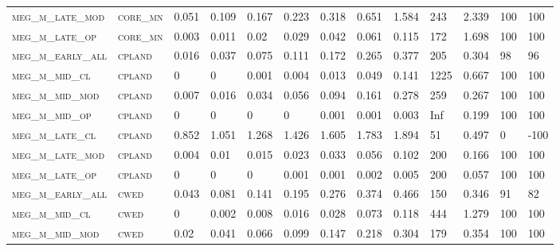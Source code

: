 \begin{landscape}
\begin{center}
\begin{footnotesize}
\begin{longtable}{lllllllllllll}
\textsc{meg\_m\_late\_mod } & \textsc{core\_mn  }   & 0.051    & 0.109    & 0.167    & 0.223    & 0.318    & 0.651    & 1.584    & 243    & 2.339         & 100           & 100             \\
\textsc{meg\_m\_late\_op  } & \textsc{core\_mn  }   & 0.003    & 0.011    & 0.02     & 0.029    & 0.042    & 0.061    & 0.115    & 172    & 1.698         & 100           & 100             \\
\textsc{meg\_m\_early\_all} & \textsc{cpland    }   & 0.016    & 0.037    & 0.075    & 0.111    & 0.172    & 0.265    & 0.377    & 205    & 0.304         & 98            & 96              \\
\textsc{meg\_m\_mid\_cl   } & \textsc{cpland    }   & 0        & 0        & 0.001    & 0.004    & 0.013    & 0.049    & 0.141    & 1225   & 0.667         & 100           & 100             \\
\textsc{meg\_m\_mid\_mod  } & \textsc{cpland    }   & 0.007    & 0.016    & 0.034    & 0.056    & 0.094    & 0.161    & 0.278    & 259    & 0.267         & 100           & 100             \\
\textsc{meg\_m\_mid\_op   } & \textsc{cpland    }   & 0        & 0        & 0        & 0        & 0.001    & 0.001    & 0.003    & Inf    & 0.199         & 100           & 100             \\
\textsc{meg\_m\_late\_cl  } & \textsc{cpland    }   & 0.852    & 1.051    & 1.268    & 1.426    & 1.605    & 1.783    & 1.894    & 51     & 0.497         & 0             & -100            \\
\textsc{meg\_m\_late\_mod } & \textsc{cpland    }   & 0.004    & 0.01     & 0.015    & 0.023    & 0.033    & 0.056    & 0.102    & 200    & 0.166         & 100           & 100             \\
\textsc{meg\_m\_late\_op  } & \textsc{cpland    }   & 0        & 0        & 0        & 0.001    & 0.001    & 0.002    & 0.005    & 200    & 0.057         & 100           & 100             \\
\textsc{meg\_m\_early\_all} & \textsc{cwed      }   & 0.043    & 0.081    & 0.141    & 0.195    & 0.276    & 0.374    & 0.466    & 150    & 0.346         & 91            & 82              \\
\textsc{meg\_m\_mid\_cl   } & \textsc{cwed      }   & 0        & 0.002    & 0.008    & 0.016    & 0.028    & 0.073    & 0.118    & 444    & 1.279         & 100           & 100             \\
\textsc{meg\_m\_mid\_mod  } & \textsc{cwed      }   & 0.02     & 0.041    & 0.066    & 0.099    & 0.147    & 0.218    & 0.304    & 179    & 0.354         & 100           & 100             \\

\end{longtable}
\end{footnotesize}
\end{center}
\end{landscape}

